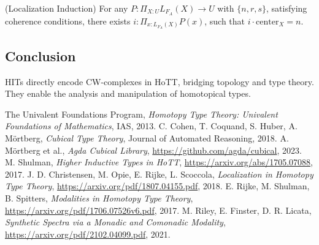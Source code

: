 \documentclass{article}
\begin{document}
\begin{theorem} (Localization Induction)
For any \( P : \Pi_{X:U} L_{F_A}(X) \to U \) with \( \{n, r, s\} \), satisfying coherence conditions,
there exists \( i : \Pi_{x:L_{F_A}(X)} P(x) \), such that \( i \cdot \text{center}_X = n \).
\end{theorem}

\subsection*{Conclusion}
HITs directly encode CW-complexes in HoTT, bridging topology and type theory.
They enable the analysis and manipulation of homotopical types.

\newpage

\begin{thebibliography}{9}
The Univalent Foundations Program, \emph{Homotopy Type Theory: Univalent Foundations of Mathematics}, IAS, 2013.
C. Cohen, T. Coquand, S. Huber, A. Mörtberg, \emph{Cubical Type Theory}, Journal of Automated Reasoning, 2018.
A. Mörtberg et al., \emph{Agda Cubical Library}, \url{https://github.com/agda/cubical}, 2023.
M. Shulman, \emph{Higher Inductive Types in HoTT}, \url{https://arxiv.org/abs/1705.07088}, 2017.
J. D. Christensen, M. Opie, E. Rijke, L. Scoccola, \emph{Localization in Homotopy Type Theory}, \url{https://arxiv.org/pdf/1807.04155.pdf}, 2018.
E. Rijke, M. Shulman, B. Spitters, \emph{Modalities in Homotopy Type Theory}, \url{https://arxiv.org/pdf/1706.07526v6.pdf}, 2017.
M. Riley, E. Finster, D. R. Licata, \emph{Synthetic Spectra via a Monadic and Comonadic Modality}, \url{https://arxiv.org/pdf/2102.04099.pdf}, 2021.
\end{thebibliography}
\end{document}
